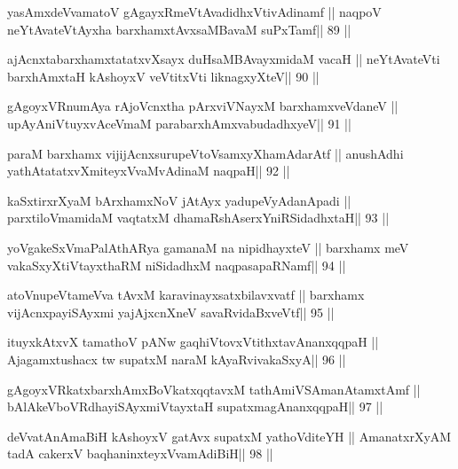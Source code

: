 \begin{shl}
yasAmxdeVvamatoV gAgayxRmeVtAvadidhxVtivAdinamf ||
naqpoV neYtAvateVtAyxha barxhamxtAvxsaMBavaM suPxTamf\hfill || 89 ||
\end{shl}

\begin{shl}
ajAcnxtabarxhamxtatatxvXsayx duHsaMBAvayxmidaM vacaH ||
neYtAvateVti barxhAmxtaH kAshoyxV veVtitxVti liknagxyXteV\hfill || 90 ||
\end{shl}

\begin{shl}
gAgoyxVR\s numAya rAjoVcnx\s tha pArxviVNayxM barxhamxveVdaneV ||
upAyAniVtuyxvAceVmaM parabarxhAmxvabudadhxyeV\hfill || 91 ||
\end{shl}

\begin{shl}
paraM barxhamx vijijAcnxsurupeVtoV\s samxyXhamAdarAtf ||
anushAdhi yathAtatatxvXmiteyxVvaMvAdinaM naqpaH\hfill || 92 ||
\end{shl}

\begin{shl}
kaSxtirxrXyaM bArxhamxNoV jAtAyx yadupeVyAdanApadi ||
parxtiloVmamidaM vaqtatxM dhamaRshAserxYniRSidadhxtaH\hfill || 93 ||
\end{shl}

\begin{shl}
yoVgakeSxVmaPalAthARya gamanaM na nipidhayxteV ||
barxhamx meV vakaSxyXtiVtayxthaRM niSidadhxM naqpasapaRNamf\hfill || 94 ||
\end{shl}

\begin{shl}
atoV\s nupeVtameVva tAvxM karavinayxsatxbilavxvatf ||
barxhamx vijAcnxpayiSAyxmi yajAjxcnXneV savaRvidaBxveVtf\hfill || 95 ||
\end{shl}

\begin{shl}
ituyxkAtxvX tamathoV pANw gaqhiVtovxVtithxtavAnanxqqpaH ||
Ajagamxtushacx tw supatxM naraM kAyaRvivakaSxyA\hfill || 96 ||
\end{shl}

\begin{shl}
gAgoyxVRkatxbarxhAmxBoVkatxqqtavxM tathA\s miVSAmanAtamxtAmf ||
bAlAkeVboVRdhayiSAyxmiVtayxtaH supatxmagAnanxqqpaH\hfill || 97 ||
\end{shl}

\begin{shl}
deVvatAnAmaBiH kAshoyxV gatAvx supatxM yathoVditeYH ||
AmanatxrXyAM tadA cakerxV baqhaninxteyxVvamAdiBiH\hfill || 98 ||
\end{shl}

